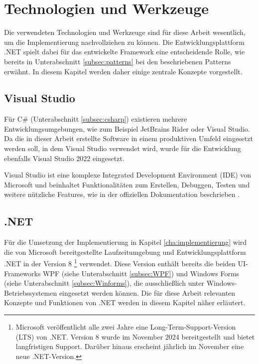 \chapter{Technologien und Werkzeuge}
\label{cha:technologie_werkzeuge}
Die verwendeten Technologien und Werkzeuge sind für diese Arbeit wesentlich, um die Implementierung nachvollziehen zu können. Die Entwicklungsplattform .NET spielt dabei für das entwickelte Framework eine entscheidende Rolle, wie bereits in Unterabschnitt \ref{subsec:patterns} bei den beschriebenen Patterns erwähnt. In diesem Kapitel werden daher einige zentrale Konzepte vorgestellt.

\section{Visual Studio}
\label{sec:visual_studio}

Für C\# (Unterabschnitt \ref{subsec:csharp}) existieren mehrere Entwicklungsumgebungen, wie zum Beispiel JetBrains Rider oder Visual Studio. Da die in dieser Arbeit erstellte Software in einem produktiven Umfeld eingesetzt werden soll, in dem Visual Studio verwendet wird, wurde für die Entwicklung ebenfalls Visual Studio 2022 eingesetzt. 

Visual Studio ist eine komplexe Integrated Development Environment (IDE) von Microsoft und beinhaltet Funktionalitäten zum Erstellen, Debuggen, Testen und weitere nützliche Features, wie in der offiziellen Dokumentation beschrieben \cite{MicrosoftVisualStudioIDE2022}.

\section{.NET}
\label{sec:dotnet}
Für die Umsetzung der Implementierung in Kapitel \ref{cha:implementierung} wird die von Microsoft bereitgestellte Laufzeitumgebung und Entwicklungsplattform .NET \cite{dotnet} in der Version 8 \footnote{Microsoft veröffentlicht alle zwei Jahre eine Long-Term-Support-Version (LTS) von .NET. Version 8 wurde im November 2024 bereitgestellt und bietet langfristigen Support. Darüber hinaus erscheint jährlich im November eine neue .NET-Version.} verwendet. Diese Version enthält bereits die beiden UI-Frameworks WPF (siehe Unterabschnitt \ref{subsec:WPF}) und Windows Forms (siehe Unterabschnitt \ref{subsec:Winforms}), die ausschließlich unter Windows-Betriebssystemen eingesetzt werden können. Die für diese Arbeit relevanten Konzepte und Funktionen von .NET werden in diesem Kapitel näher erläutert.

